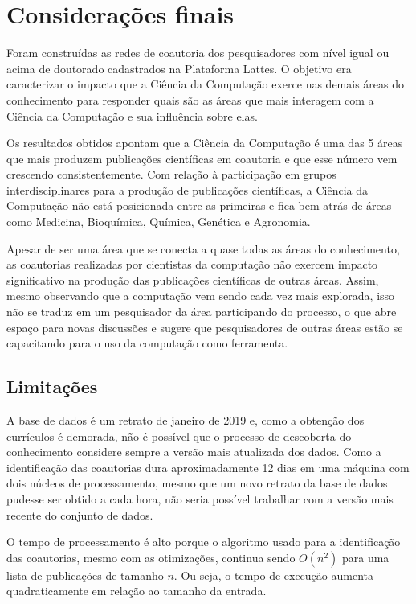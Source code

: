 \chapter{Considerações finais}

Foram construídas as redes de coautoria dos pesquisadores com nível igual ou acima de doutorado cadastrados na Plataforma Lattes. O objetivo era caracterizar o impacto que a Ciência da Computação exerce nas demais áreas do conhecimento para responder quais são as áreas que mais interagem com a Ciência da Computação e sua influência sobre elas.

Os resultados obtidos apontam que a Ciência da Computação é uma das 5 áreas que mais produzem publicações científicas em coautoria e que esse número vem crescendo consistentemente. Com relação à participação em grupos interdisciplinares para a produção de publicações científicas, a Ciência da Computação não está posicionada entre as primeiras e fica bem atrás de áreas como Medicina, Bioquímica, Química, Genética e Agronomia.

Apesar de ser uma área que se conecta a quase todas as áreas do conhecimento, as coautorias realizadas por cientistas da computação não exercem impacto significativo na produção das publicações científicas de outras áreas. Assim, mesmo observando que a computação vem sendo cada vez mais explorada, isso não se traduz em um pesquisador da área participando do processo, o que abre espaço para novas discussões e sugere que pesquisadores de outras áreas estão se capacitando para o uso da computação como ferramenta.

\section{Limitações}

A base de dados é um retrato de janeiro de 2019 e, como a obtenção dos currículos é demorada, não é possível que o processo de descoberta do conhecimento considere sempre a versão mais atualizada dos dados. Como a identificação das coautorias dura aproximadamente 12 dias em uma máquina com dois núcleos de processamento, mesmo que um novo retrato da base de dados pudesse ser obtido a cada hora, não seria possível trabalhar com a versão mais recente do conjunto de dados.

O tempo de processamento é alto porque o algoritmo usado para a identificação das coautorias, mesmo com as otimizações, continua sendo $O(n^2)$ para uma lista de publicações de tamanho $n$. Ou seja, o tempo de execução aumenta quadraticamente em relação ao tamanho da entrada.

